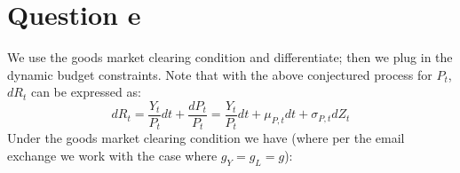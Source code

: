 \documentclass{article}
\begin{document}
\section*{Question e}
We use the goods market clearing condition and differentiate; then we plug in the dynamic budget constraints. Note that with the above conjectured process for $P_t$,
$dR_t$ can be expressed as:
\[
    d R_t = \frac{Y_t}{P_t} d t + \frac{d P_t}{P_t} =  \frac{Y_t}{P_t} d t + \mu_{P, t} d t+\sigma_{P, t} d Z_{t}  
\]
Under the goods market clearing condition we have (where per the email exchange we work with the case where $g_Y = g_L = g$):
\end{document}
